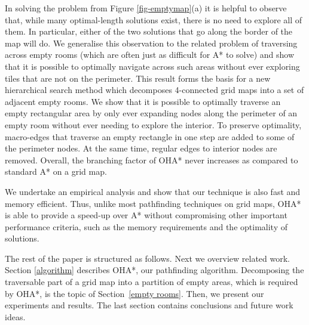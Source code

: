 In solving the problem from Figure \ref{fig-emptymap}(a) it is helpful to observe that,
while many optimal-length solutions exist, there is no need to explore all of them.
In particular, either of the two solutions that go along the border of the map will do.
We generalise this observation to the related problem of traversing across empty rooms (which are 
often just as difficult for A* to solve) and show that it is possible to optimally navigate across 
such areas without ever exploring tiles that are not on the perimeter.
This result forms the basis for a new hierarchical search method which decomposes 4-connected grid maps
into a set of adjacent empty rooms. 
We show that it is possible to optimally traverse an empty rectangular area by only ever expanding nodes along the perimeter of an empty room without ever needing to explore the interior.
To preserve optimality, macro-edges that traverse an empty rectangle in one step are added to some of the perimeter nodes. 
At the same time, regular edges to interior nodes are removed.
Overall, the branching factor of OHA* never increases as compared to standard A* on a grid map.

We undertake an empirical analysis and show that our technique is also fast and memory efficient.
Thus, unlike most pathfinding techniques on grid maps, OHA* is able to provide a speed-up over A*
without compromising other important performance criteria, such as the memory requirements
and the optimality of solutions.

The rest of the paper is structured as follows.
Next we overview related work.
Section \ref{algorithm} describes OHA*, our pathfinding algorithm.
Decomposing the traversable part of a grid map into a partition of empty areas,
which is required by OHA*, is the topic of Section~\ref{empty rooms}.
Then, we present our experiments and results.
The last section contains conclusions and future work ideas.




